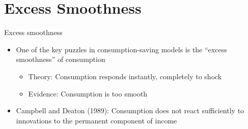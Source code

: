 \documentclass[10pt,english,t,10pt]{beamer}
\newcommand{\jbemph}[1]{\textbf{\color{SlideNavy}#1}}
\begin{document}
%

\section{Excess Smoothness}
\begin{frame}{Excess smoothness}

	\begin{itemize}       
		
		\item  One of the key puzzles in consumption-saving models is the ``excess smoothness'' of consumption
	
	\begin{itemize}       
		
		\item  Theory:  Consumption responds instantly, completely to shock           
		

		
		\item Evidence: Consumption is too smooth 
	
	\end{itemize}     

\pause

		\item Campbell and Deaton (1989): Consumption does not react sufficiently to innovations to the permanent component of income
	
	\end{itemize}     

\end{frame}
\end{document}
